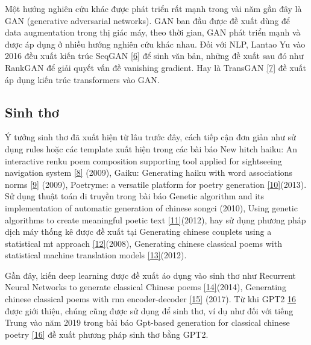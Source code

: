 \documentclass[a4paper]{article}
\theoremstyle{definition}
\begin{document}
Một hướng nghiên cứu khác được phát triển rất mạnh trong vài năm gần đây là GAN (generative adversarial networks). GAN ban đầu được đề xuất dùng để data augmentation trong thị giác máy, theo thời gian, GAN phát triển mạnh và được áp dụng ở nhiều hướng nghiên cứu khác nhau. Đối với NLP, Lantao Yu vào 2016 đều xuất kiến trúc SeqGAN \href{https://arxiv.org/abs/1609.05473}{[6]} để sinh văn bản, những đề xuất sau đó như RankGAN để giải quyết vấn đề vanishing gradient. Hay là TransGAN \href{https://arxiv.org/abs/2102.07074}{[7]} đề xuất áp dụng kiến trúc transformers vào GAN. 
\subsection{Sinh thơ}
Ý tưởng sinh thơ đã xuất hiện từ lâu trước đây, cách tiếp cận đơn giản như sử dụng rules hoặc các template xuất hiện trong các bài báo New hitch haiku: An interactive renku poem composition supporting tool applied for sightseeing navigation system \href{https://scholarbank.nus.edu.sg/handle/10635/71127}{[8]} (2009), Gaiku: Generating haiku with word associations norms \href{https://aclanthology.org/W09-2005.pdf}{[9]} (2009), Poetryme: a versatile platform for poetry generation \href{https://www.researchgate.net/publication/236445297_PoeTryMe_a_versatile_platform_for_poetry_generation}{[10]}(2013). Sử dụng thuật toán di truyền trong bài báo Genetic algorithm and its implementation of automatic generation of chinese songci (2010), Using genetic algorithms to create meaningful poetic text \href{https://www.researchgate.net/publication/251042982_Genetic_Algorithm_and_Its_Implementation_of_Automatic_Generation_of_Chinese_SONGCI_Genetic_Algorithm_and_Its_Implementation_of_Automatic_Generation_of_Chinese_SONGCI}{[11]}(2012), hay sử dụng phương pháp dịch máy thống kê được đề xuất tại Generating chinese couplets using a statistical mt approach \href{https://aclanthology.org/C08-1048/}{[12]}(2008), Generating chinese classical poems with statistical machine translation models \href{https://dl.acm.org/doi/10.5555/2900929.2900962}{[13]}(2012).

Gần đây, kiến deep learning được đề xuất áo dụng vào sinh thơ như Recurrent Neural Networks to generate classical Chinese poems \href{https://www.semanticscholar.org/paper/Chinese-Poetry-Generation-with-Recurrent-Neural-Zhang-Lapata/229ec55602143271867682d181ec35f2e43e06e8}{[14]}(2014), Generating chinese classical poems with rnn encoder-decoder \href{https://arxiv.org/pdf/1604.01537.pdf}{[15]} (2017). Từ khi GPT2 \href{https://d4mucfpksywv.cloudfront.net/better-language-models/language_models_are_unsupervised_multitask_learners.pdf}{16} được giới thiệu, chúng cũng được sử dụng để sinh thơ, ví dụ như đối với tiếng Trung vào năm 2019 trong bài báo Gpt-based generation for classical chinese poetry \href{https://arxiv.org/abs/1907.00151}{[16]} đề xuất phương pháp sinh thơ bằng GPT2. 
\newpage
\end{document}
